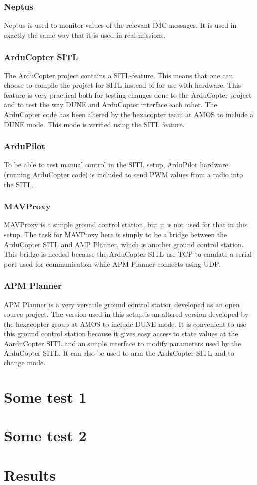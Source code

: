 \subsubsection*{Neptus}
Neptus is used to monitor values of the relevant IMC-messages. It is used in exactly the same way that it is used in real missions.
\subsubsection*{ArduCopter SITL}
The ArduCopter project contains a SITL-feature. This means that one can choose to compile the project for SITL instead of for use with hardware. This feature is very practical both for testing changes done to the ArduCopter project and to test the way DUNE and ArduCopter interface each other. The ArduCopter code has been altered by the hexacopter team at AMOS to include a DUNE mode. This mode is verified using the SITL feature.
\subsubsection*{ArduPilot}
To be able to test manual control in the SITL setup, ArduPilot hardware (running ArduCopter code) is included to send PWM values from a radio into the SITL.
\subsubsection*{MAVProxy}
MAVProxy is a simple ground control station, but it is not used for that in this setup. The task for MAVProxy here is simply to be a bridge between the ArduCopter SITL and AMP Planner, which is another ground control station. This bridge is needed because the ArduCopter SITL use TCP to emulate a serial port used for communication while APM Planner connects using UDP.
\subsubsection*{APM Planner}
APM Planner is a very versatile ground control station developed as an open source project. The version used in this setup is an altered version developed by the hexacopter group at AMOS to include DUNE mode. It is convenient to use this ground control station because it gives easy access to state values at the AarduCopter SITL and an simple interface to modify parameters used by the ArduCopter SITL. It can also be used to arm the ArduCopter SITL and to change mode.
\section{Some test 1}
\section{Some test 2}
\section{Results}